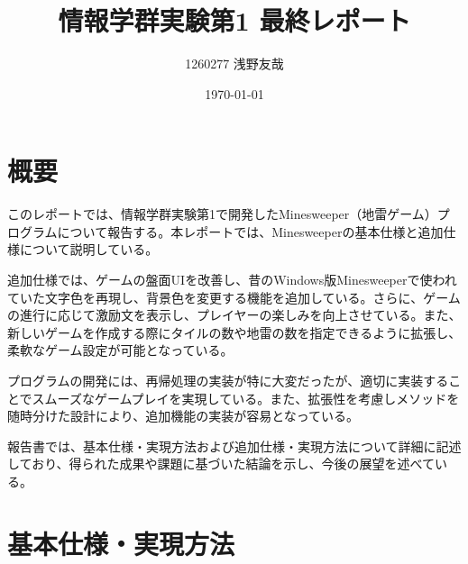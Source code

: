 \documentclass[a4j,12pt]{jsarticle}
\title{情報学群実験第1  最終レポート}
\author{1260277 浅野友哉}
\date{\today}
\begin{document}
\maketitle

\tableofcontents
\clearpage




\section{概要}
このレポートでは、情報学群実験第1で開発したMinesweeper（地雷ゲーム）プログラムについて報告する。本レポートでは、Minesweeperの基本仕様と追加仕様について説明している。

追加仕様では、ゲームの盤面UIを改善し、昔のWindows版Minesweeperで使われていた文字色を再現し、背景色を変更する機能を追加している。さらに、ゲームの進行に応じて激励文を表示し、プレイヤーの楽しみを向上させている。また、新しいゲームを作成する際にタイルの数や地雷の数を指定できるように拡張し、柔軟なゲーム設定が可能となっている。

プログラムの開発には、再帰処理の実装が特に大変だったが、適切に実装することでスムーズなゲームプレイを実現している。また、拡張性を考慮しメソッドを随時分けた設計により、追加機能の実装が容易となっている。

報告書では、基本仕様・実現方法および追加仕様・実現方法について詳細に記述しており、得られた成果や課題に基づいた結論を示し、今後の展望を述べている。

\section{基本仕様・実現方法}
\end{document}
